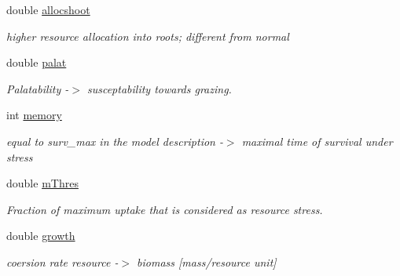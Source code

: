 \begin{DoxyCompactItemize}
\mbox{\label{class_s_pft_traits_a343818fc987d00c8a4018cb9316be78c}} 
double \mbox{\hyperlink{class_s_pft_traits_a343818fc987d00c8a4018cb9316be78c}{allocshoot}}
\begin{DoxyCompactList}\small\item\em higher resource allocation into roots; different from normal \end{DoxyCompactList}\item 
\mbox{\label{class_s_pft_traits_a46b25852e248d4e9d7415c8a65b83698}} 
double \mbox{\hyperlink{class_s_pft_traits_a46b25852e248d4e9d7415c8a65b83698}{palat}}
\begin{DoxyCompactList}\small\item\em Palatability -\/$>$ susceptability towards grazing. \end{DoxyCompactList}\item 
\mbox{\label{class_s_pft_traits_a20e26fab4451ca789976a54a72bf882c}} 
int \mbox{\hyperlink{class_s_pft_traits_a20e26fab4451ca789976a54a72bf882c}{memory}}
\begin{DoxyCompactList}\small\item\em equal to surv\+\_\+max in the model description -\/$>$ maximal time of survival under stress \end{DoxyCompactList}\item 
\mbox{\label{class_s_pft_traits_ae285db0958ed2a5e13b1add0d0663f35}} 
double \mbox{\hyperlink{class_s_pft_traits_ae285db0958ed2a5e13b1add0d0663f35}{m\+Thres}}
\begin{DoxyCompactList}\small\item\em Fraction of maximum uptake that is considered as resource stress. \end{DoxyCompactList}\item 
\mbox{\label{class_s_pft_traits_a8e4a70516dad4ce97ad5df9caaf70bc7}} 
double \mbox{\hyperlink{class_s_pft_traits_a8e4a70516dad4ce97ad5df9caaf70bc7}{growth}}
\begin{DoxyCompactList}\small\item\em coersion rate resource -\/$>$ biomass \mbox{[}mass/resource unit\mbox{]} \end{DoxyCompactList}\item 
\mbox{\label{class_s_pft_traits_a50a419d8d60294c78f7122e0e7c02639}} 

\end{DoxyCompactItemize}
